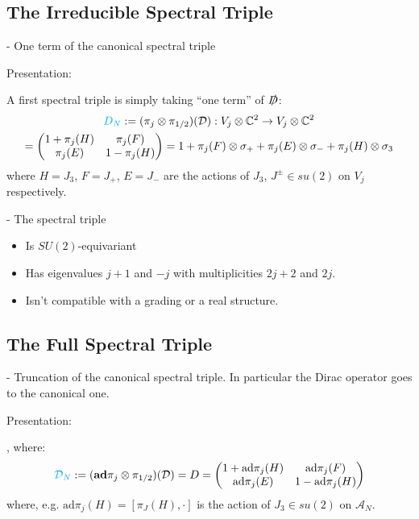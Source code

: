 \subsection{The Irreducible Spectral Triple}
 
 - One term of the canonical spectral triple
 
Presentation:

A first spectral triple is simply taking ``one term'' of $\slashed D$:
\begin{multline}
    \textcolor{cyan}{D_N} 
    := (\pi_j \otimes \pi_{1/2})(\mathcal D): V_j \otimes \mathbb{C}^2 \to V_j \otimes \mathbb{C}^2 \\
    = \begin{pmatrix} 1 + \pi_j(H) & \pi_j(F) \\ \pi_j(E) & 1 - \pi_j(H)\end{pmatrix} 
    = 1 + \pi_j(F) \otimes \sigma_+ + \pi_j(E) \otimes \sigma_- + \pi_j(H) \otimes \sigma_3
\end{multline} where $H = J_3$, $F = J_+$, $E = J_-$ are the actions of $J_3$, $J^\pm \in su(2)$ on $V_j$ respectively.

- The spectral triple 
    \begin{itemize}
        
    \item Is $SU(2)$-equivariant
    
    \item Has eigenvalues $j+1$ and $-j$ with multiplicities $2j+2$ and $2j$.
        
    \item Isn't compatible with a grading or a real structure.
    \end{itemize}
    
\linea




\subsection{The Full Spectral Triple}

- Truncation of the canonical spectral triple. In particular the Dirac operator goes to the canonical one.

Presentation:

, where:
\begin{multline}
    \textcolor{cyan}{\mathcal D_N} := (\textbf{ad}\pi_j \otimes \pi_{1/2})(\mathcal D) = D = \begin{pmatrix} 1 + \text{ad}\pi_j(H) & \text{ad}\pi_j(F) \\ \text{ad}\pi_j(E) & 1 - \text{ad}\pi_j(H)\end{pmatrix} 
\end{multline}
where, e.g. $\text{ad}\pi_j(H) = [\pi_J(H), \cdot ]$ is the action of $J_3 \in su(2)$ on $\mathcal A_N$.

